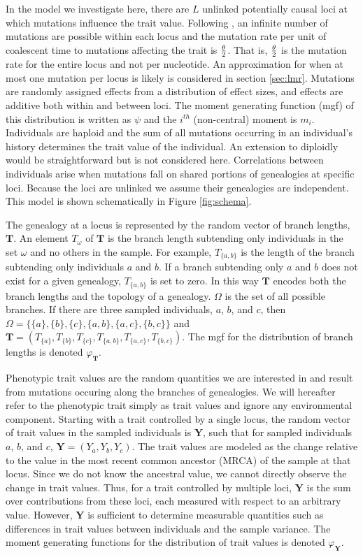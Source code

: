In the model we investigate here, there are $L$ unlinked potentially causal loci
at which mutations influence the trait value. Following \citet{Kimura1969}, an
infinite number of mutations are possible within each locus and the mutation
rate per unit of coalescent time to mutations affecting the trait is $\frac{\theta}{2}$. That
is, $\frac{\theta}{2}$ is the mutation rate for the entire locus and not per nucleotide. An
approximation for when at most one mutation per locus is likely is considered in
section \ref{sec:lmr}. Mutations are randomly assigned effects from a
distribution of effect sizes, and effects are additive both within and between
loci. The moment generating function (mgf) of this distribution is written as
$\psi$ and the $i^{th}$ (non-central) moment is $m_i$. Individuals are haploid
and the sum of all mutations occurring in an individual's history determines the
trait value of the individual. An extension to diploidly would be
straightforward but is not considered here. Correlations between individuals
arise when mutations fall on shared portions of genealogies at specific loci.
Because the loci are unlinked we assume their genealogies are independent. This
model is shown schematically in Figure \ref{fig:schema}.

The genealogy at a locus is represented by the random vector of branch lengths,
$\mathbf{T}$. An element $T_{\omega}$ of $\mathbf{T}$ is the branch length
subtending only individuals in the set $\omega$ and no others in the sample. For
example, $T_{\{a,b\}}$ is the length of the branch subtending only individuals
$a$ and $b$. If a branch subtending only $a$ and $b$ does not exist for a given
genealogy, $T_{\{a,b\}}$ is set to zero. In this way $\mathbf{T}$ encodes both
the branch lengths and the topology of a genealogy. $\Omega$ is the set of all
possible branches. If there are three sampled individuals, $a$, $b$, and $c$,
then $\Omega=\{\{a\},\{b\},\{c\},\{a,b\},\{a,c\},\{b,c\}\}$ and
$\mathbf{T}=(T_{\{a\}},T_{\{b\}},T_{\{c\}},T_{\{a,b\}},T_{\{a,c\}},T_{\{b,c\}})$.
The mgf for the distribution of branch lengths is denoted $\varphi_{\mathbf{T}}$.

Phenotypic trait values are the random quantities we are interested in and
result from mutations occuring along the branches of genealogies. We will
hereafter refer to the phenotypic trait simply as trait values and ignore any
environmental component. Starting with a trait controlled by a single locus, the
random vector of trait values in the sampled individuals is $\mathbf{Y}$, such
that for sampled individuals $a$, $b$, and $c$, $\mathbf{Y}=(Y_a,Y_b,Y_c)$. The
trait values are modeled as the change relative to the value in the most recent
common ancestor (MRCA) of the sample at that locus. Since we do not know the
ancestral value, we cannot directly observe the change in trait values. Thus,
for a trait controlled by multiple loci, $\mathbf{Y}$ is the sum over
contributions from these loci, each measured with respect to an arbitrary value.
However, $\mathbf{Y}$ is sufficient to determine measurable quantities such as
differences in trait values between individuals and the sample variance. The
moment generating functions for the distribution of trait values is denoted
$\varphi_{\mathbf{Y}}$.

